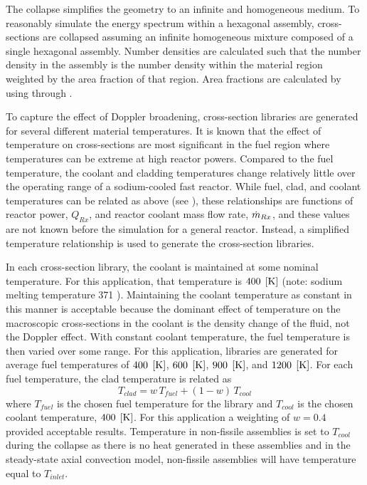     The collapse simplifies the geometry to an infinite and homogeneous medium.
    To reasonably simulate the energy spectrum within a hexagonal assembly,
    cross-sections are collapsed assuming an infinite homogeneous mixture 
    composed of a single hexagonal assembly. Number densities are calculated 
    such that the number density in the assembly is the number density within
    the material region weighted by the area fraction of that region. Area
    fractions are calculated by using  through 
    .
    
    To capture the effect of Doppler broadening, cross-section libraries are
    generated for several different material temperatures.
    It is known that the effect of temperature on cross-sections are most
    significant in the fuel region where temperatures can be extreme at high
    reactor powers. Compared to the fuel temperature, the coolant and cladding
    temperatures change relatively little over the operating range of a
    sodium-cooled fast reactor.
    While fuel, clad, and coolant temperatures can be related as above (see
    ), these
    relationships are functions of reactor power, $Q_{Rx}$, and reactor 
    coolant mass flow rate, $\dot{m}_{Rx}$, and these values are not known before 
    the simulation for a general reactor. Instead, a simplified temperature 
    relationship is used to generate the cross-section libraries.

    In each cross-section library, the coolant is maintained at some nominal
    temperature. For this application, that temperature is $400 \;\left[\text{{K}}\right]$
    (note: sodium melting temperature 371 ). Maintaining the coolant
    temperature as constant in this manner
    is acceptable because the dominant effect of temperature on the macroscopic
    cross-sections in the coolant is the density change of the fluid, not the
    Doppler effect. With constant coolant temperature, the fuel temperature is
    then varied over some range. For this application, libraries are generated
    for average fuel temperatures of 
    $400 \;\left[\text{{K}}\right]$, $600 \;\left[\text{{K}}\right]$, $900 \;\left[\text{{K}}\right]$, and $1200 \;\left[\text{{K}}\right]$. For
    each fuel temperature, the clad temperature is related as 
    \begin{equation}
      T_{clad} = w \, T_{fuel} + (1-w) \, T_{cool}
    \end{equation}
    where $T_{fuel}$ is the chosen fuel temperature for the library and
    $T_{cool}$ is the chosen coolant temperature, $400 \;\left[\text{{K}}\right]$. For this 
    application a weighting of $w=0.4$ provided acceptable results. Temperature
    in non-fissile assemblies is set to $T_{cool}$ during the collapse as there
    is no heat generated in these assemblies and in the steady-state axial
    convection model, non-fissile assemblies will have temperature equal to 
    $T_{inlet}$.

